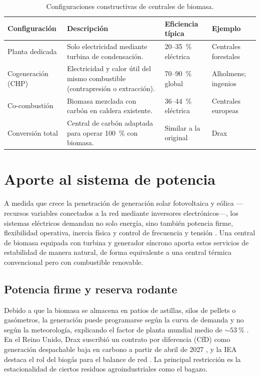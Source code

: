 \begin{table}[htbp]
\centering
\caption{Configuraciones constructivas de centrales de biomasa.}
\label{tab:configuraciones_planta}
\begin{tabularx}{\textwidth}{@{}l X l l@{}}
\toprule
\textbf{Configuración} & \textbf{Descripción} & \textbf{Eficiencia típica} & \textbf{Ejemplo} \\
\midrule
Planta dedicada & Solo electricidad mediante turbina de condensación. & 20--35~\% eléctrica & Centrales forestales \\
Cogeneración (CHP) & Electricidad y calor útil del mismo combustible (contrapresión o extracción). & 70--90~\% global & Alholmens; ingenios \\
Co-combustión & Biomasa mezclada con carbón en caldera existente. & 36--44~\% eléctrica \cite{irena2013cofiring} & Centrales europeas \\
Conversión total & Central de carbón adaptada para operar 100~\% con biomasa. & Similar a la original & Drax \cite{drax2025annual} \\
\bottomrule
\end{tabularx}
\end{table}

\section{Aporte al sistema de potencia}
\label{sec:aporte_red}

A medida que crece la penetración de generación solar fotovoltaica y eólica ---recursos variables conectados a la red mediante inversores electrónicos---, los sistemas eléctricos demandan no solo energía, sino también potencia firme, flexibilidad operativa, inercia física y control de frecuencia y tensión \cite{bindu2025inertia, denholm2020inertia}. Una central de biomasa equipada con turbina y generador síncrono aporta estos servicios de estabilidad de manera natural, de forma equivalente a una central térmica convencional pero con combustible renovable.

\subsection{Potencia firme y reserva rodante}
Debido a que la biomasa se almacena en patios de astillas, silos de pellets o gasómetros, la generación puede programarse según la curva de demanda y no según la meteorología, explicando el factor de planta mundial medio de $\sim 53~\%$ \cite{wba2025gbsr}. En el Reino Unido, Drax suscribió un contrato por diferencia (CfD) como generación despachable baja en carbono a partir de abril de 2027 \cite{woodbioenergy2026drax}, y la IEA destaca el rol del biogás para el balance de red \cite{iea2025biogas}. La principal restricción es la estacionalidad de ciertos residuos agroindustriales como el bagazo.

